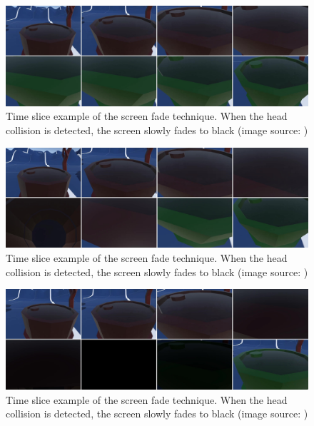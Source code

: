 \begin{figure}[th]
\centering
\includegraphics[width=1\textwidth]{img/instant_implementation.jpg}
\caption{Time slice example of the screen fade technique. When the head collision is detected, the screen slowly fades to black (image source: \cite{SCREENFADE})}
\label{fig:instantimplementation}
\end{figure}

\begin{figure}[th]
\centering
\includegraphics[width=1\textwidth]{img/delayed_implementation.jpg}
\caption{Time slice example of the screen fade technique. When the head collision is detected, the screen slowly fades to black (image source: \cite{SCREENFADE})}
\label{fig:delayedimplementation}
\end{figure}

\begin{figure}[th]
\centering
\includegraphics[width=1\textwidth]{img/fade_implementation.jpg}
\caption{Time slice example of the screen fade technique. When the head collision is detected, the screen slowly fades to black (image source: \cite{SCREENFADE})}
\label{fig:fadeimplementation}
\end{figure}

